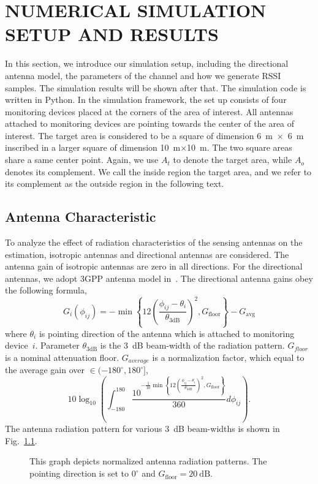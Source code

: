 \chapter{NUMERICAL SIMULATION SETUP AND RESULTS}

In this section, we introduce our simulation setup, including the directional antenna model, the parameters of the channel and how we generate RSSI samples.
The simulation results will be shown after that.
The simulation code is written in Python.
In the simulation framework, the set up consists of four monitoring devices placed at the corners of the area of interest.
All antennas attached to monitoring devices are pointing towards the center of the area of interest.
The target area is considered to be a square of dimension 6~m~×~6~m inscribed in a larger square of dimension 10~m×10~m.
The two square areas share a same center point.
Again, we use $A_{t}$ to denote the target area, while $A_{o}$ denotes its complement.
We call the inside region the target area, and we refer to its complement as the outside region in the following text.


\section{Antenna Characteristic}

To analyze the effect of radiation characteristics of the sensing antennas on the estimation, isotropic antennas and directional antennas are considered.
The antenna gain of isotropic antennas are zero in all directions.
For the directional antennas, we adopt 3GPP antenna model in~\cite{3GPP-antenna}.
The directional antenna gains obey the following formula,
\begin{equation*}
G_i (\phi_{ij}) = - \min \left\{
12 \left( \frac{\phi_{ij} - \theta_{i}}{\theta_{\mathrm{3dB}}} \right)^2,
G_{\mathrm{floor}} \right\} - G_{\mathrm{avg}}
\end{equation*}
where $\theta_{i}$ is pointing direction of the antenna which is attached to monitoring device~$i$.
Parameter $\theta_{\mathrm{3dB}}$ is the 3~dB beam-width of the radiation pattern.
$G_{floor}$ is a nominal attenuation floor.
$G_{average}$ is a normalization factor, which equal to the average gain over $\in (-180^{\circ}, 180^{\circ}]$,
\begin{equation*}
10 \log_{10} \left( \int_{-180}^{180}
\frac{ 10^{ - \frac{1}{10} \min \left\{
12 \left( \frac{\phi_{ij} - \theta_{i}}{\theta_{\mathrm{3dB}}} \right)^2,
G_{\mathrm{floor}} \right\} } }{360} d \phi_{ij} \right) .
\end{equation*}
The antenna radiation pattern for various 3~dB beam-widths is shown in Fig.~\ref{figure:AntennaCandidates}.
\begin{figure}[t]
	\centerline{}
	\caption{This graph depicts normalized antenna radiation patterns. The pointing direction is set to $ 0^{\circ}$ and $G_{\mathrm{floor}} = 20~\mathrm{dB}$.}
	\label{figure:AntennaCandidates}
\end{figure}


